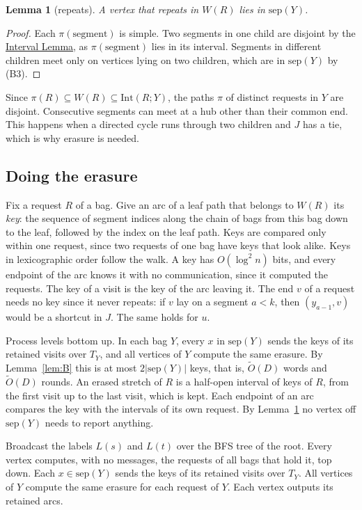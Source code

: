 \documentclass[11pt]{article}
\newtheorem{lemma}[theorem]{Lemma}
\theoremstyle{definition}
\theoremstyle{remark}
\theoremstyle{plain}
\newcommand{\AlgPath}{\textsc{SimplePath}}
\newcommand{\Ot}{\tilde O}
\newcommand{\sep}{\mathrm{sep}}
\newcommand{\Int}{\mathrm{Int}}
\begin{document}
\begin{lemma}[repeats]\label{lem:C}
A vertex that repeats in $W(R)$ lies in $\sep(Y)$.
\end{lemma}
\begin{proof}
Each $\pi(\text{segment})$ is simple. Two segments in one child are disjoint by the \hyperref[lem:A]{Interval Lemma},
as $\pi(\text{segment})$ lies in its interval. Segments in different children meet only on vertices lying on two
children, which are in $\sep(Y)$ by (B3).
\end{proof}

Since $\pi(R)\subseteq W(R)\subseteq\Int(R;Y)$, the paths $\pi$ of distinct requests in $Y$ are disjoint. Consecutive
segments can meet at a hub other than their common end. This happens when a directed cycle runs through two
children and $J$ has a tie, which is why erasure is needed.

\subsection{Doing the erasure}

Fix a request $R$ of a bag. Give an arc of a leaf path that belongs to $W(R)$ its \emph{key}: the sequence of segment
indices along the chain of bags from this bag down to the leaf, followed by the index on the leaf path. Keys are
compared only within one request, since two requests of one bag have keys that look alike. Keys in lexicographic order follow the walk.
A key has $O(\log^2n)$ bits, and every endpoint of the arc knows it with no communication, since it computed the
requests. The key of a visit is the key of the arc leaving it. The end $v$ of a request needs no key since it never
repeats: if $v$ lay on a segment $a<k$, then $(y_{a-1},v)$ would be a shortcut in $J$. The same holds for $u$.

Process levels bottom up. In each bag $Y$, every $x$ in $\sep(Y)$ sends the keys of its retained visits over $T_Y$, and
all vertices of $Y$ compute the same erasure. By Lemma~\ref{lem:B} this is at most $2|\sep(Y)|$ keys, that is,
$\Ot(D)$ words and $\Ot(D)$ rounds. An erased stretch of $R$ is a half-open interval of keys of $R$, from the first
visit up to the last visit, which is kept. Each endpoint of an arc compares the key with the intervals of its own
request. By Lemma~\ref{lem:C} no vertex off $\sep(Y)$ needs to report anything.

\begin{algorithm}[t]
\caption{\AlgPath{}$(s,t)$}\label{alg:path}
\begin{algorithmic}[1]
\State Broadcast the labels $L(s)$ and $L(t)$ over the BFS tree of the root.
\State Every vertex computes, with no messages, the requests of all bags that hold it, top down.
  \State Each $x\in\sep(Y)$ sends the keys of its retained visits over $T_Y$.
  \State All vertices of $Y$ compute the same erasure for each request of $Y$.
\EndFor
\State Each vertex outputs its retained arcs.
\end{algorithmic}
\end{algorithm}
\end{document}
